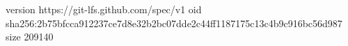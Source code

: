 version https://git-lfs.github.com/spec/v1
oid sha256:2b75bfcca912237ce7d8e32b2bc07dde2c44ff1187175c13c4b9c916bc56d987
size 209140

